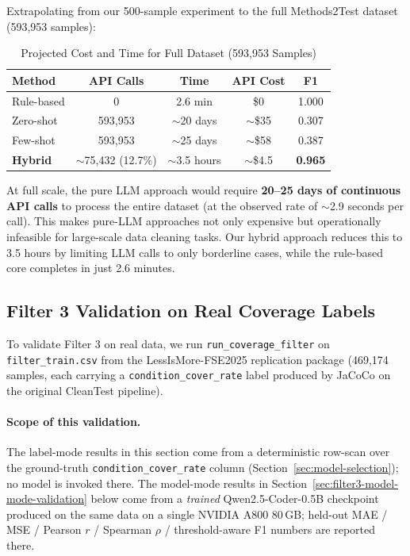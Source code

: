 \documentclass[acmlarge,nonacm,screen]{acmart}
\begin{document}
Extrapolating from our 500-sample experiment to the full Methods2Test dataset (593,953 samples):

\begin{table}[htbp]
\caption{Projected Cost and Time for Full Dataset (593,953 Samples)}
\label{tab:full-projection}
\begin{tabular}{@{}lcccc@{}}
\toprule
\textbf{Method} & \textbf{API Calls} & \textbf{Time} & \textbf{API Cost\footnotemark} & \textbf{F1} \\
\midrule
Rule-based & 0 & 2.6 min & \$0 & 1.000 \\
Zero-shot & 593,953 & $\sim$20 days & $\sim$\$35 & 0.307 \\
Few-shot & 593,953 & $\sim$25 days & $\sim$\$58 & 0.387 \\
\textbf{Hybrid} & $\sim$75,432 (12.7\%) & $\sim$3.5 hours & $\sim$\$4.5 & \textbf{0.965} \\
\bottomrule
\end{tabular}
\end{table}

At full scale, the pure LLM approach would require \textbf{20--25 days of continuous API calls} to process the entire dataset (at the observed rate of $\sim$2.9 seconds per call). This makes pure-LLM approaches not only expensive but operationally infeasible for large-scale data cleaning tasks. Our hybrid approach reduces this to 3.5 hours by limiting LLM calls to only borderline cases, while the rule-based core completes in just 2.6 minutes.

\subsection{Filter 3 Validation on Real Coverage Labels}
\label{sec:filter3-validation}

To validate Filter 3 on real data, we run \texttt{run\_coverage\_filter}
on \texttt{filter\_train.csv} from the LessIsMore-FSE2025 replication
package (469{,}174 samples, each carrying a \texttt{condition\_cover\_rate}
label produced by JaCoCo on the original CleanTest pipeline).

\paragraph{Scope of this validation.} The label-mode results in
this section come from a deterministic row-scan over the
ground-truth \texttt{condition\_cover\_rate} column
(Section~\ref{sec:model-selection}); no model is invoked there.
The model-mode results in
Section~\ref{sec:filter3-model-mode-validation} below come from a
\emph{trained} Qwen2.5-Coder-0.5B checkpoint produced on the same
data on a single NVIDIA A800 80\,GB; held-out MAE / MSE / Pearson
$r$ / Spearman $\rho$ / threshold-aware F1 numbers are reported
there.
\end{document}
